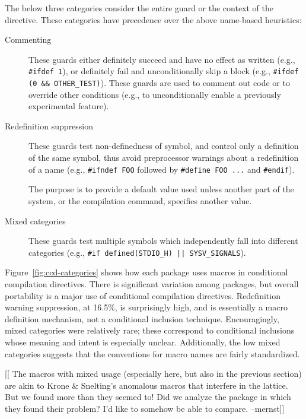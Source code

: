 \documentclass[10pt]{article}
\begin{document}
The below three categories consider the entire guard or the context of
the directive.  These categories have precedence over the above name-based
heuristics:

\begin{description}
\item[Commenting] These guards either definitely succeed and
  have no effect as written (e.g., \texttt{\#ifdef 1}), or definitely fail
  and unconditionally skip a block (e.g., {\tt \#ifdef (0 \&\&
    \verb|OTHER_TEST|)}).  These guards are used to comment out code or to
  override other conditions (e.g., to unconditionally enable a previously
  experimental feature).
      
\item[Redefinition suppression] These guards test non-definedness of
  symbol, and control only  a definition of the same symbol, thus avoid preprocessor
      warnings about a redefinition of a name (e.g., \texttt{\#ifndef
      FOO} followed by \texttt{\#define FOO ...} and \texttt{\#endif}).
    
    The purpose is to provide a default value used unless another part of
    the system, or the compilation command, specifies another value.

\item[Mixed categories] These guards test multiple symbols
      which independently fall into different categories (e.g.,
      {\tt \#if defined(\verb|STDIO_H|) || \verb|SYSV_SIGNALS|}).

\end{description}



Figure~\ref{fig:ccd-categories} shows how each package uses macros in
conditional compilation directives.  There is significant variation
among packages, but overall portability is a major use of conditional
compilation directives.  Redefinition warning suppression, at 16.5\%, is
surprisingly high, and is essentially a macro definition mechanism, not
a conditional inclusion technique.  Encouragingly, mixed categories were
relatively rare; these correspond to conditional inclusions whose
meaning and intent is especially unclear.  Additionally, the low mixed
categories suggests that the conventions for macro names are fairly
standardized.

[[ The macros with mixed usage (especially here, but also in the
previous section) are akin to Krone \& Snelting's anomalous macros that
interfere in the lattice.  But we found more than they seemed to!  Did
we analyze the package in which they found their problem?  I'd like to
somehow be able to compare. --mernst]]
      
\end{document}
